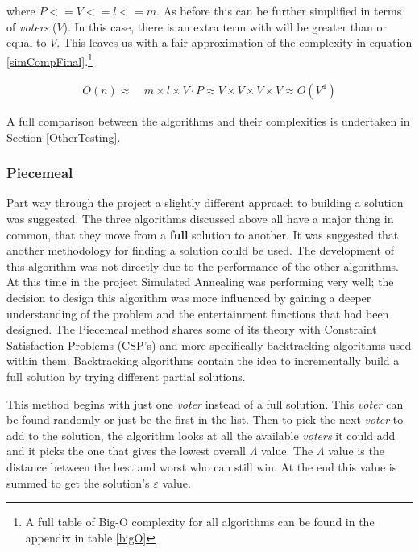 \documentclass[12pt]{report}
\begin{document}
where $P <= V <= l <= m$. As before this can be further simplified in terms of \textit{voters} ($V$). In this case, there is an extra term with will be greater than or equal to $V$. This leaves us with a fair approximation of the complexity in equation \ref{simCompFinal}.\footnote{A full table of Big-O complexity for all algorithms can be found in the appendix in table \ref{bigO}}

\begin{equation}\label{simCompFinal}
\begin{aligned}
	O(n) \approx{} & \ m \times l \times V \cdot P \approx V \times V \times V \times V \approx O(V^4)
\end{aligned}
\end{equation}

A full comparison between the algorithms and their complexities is undertaken in Section \ref{OtherTesting}.


\subsubsection{Piecemeal}
Part way through the project a slightly different approach to building a solution was suggested. The three algorithms discussed above all have a major thing in common, that they move from a \textbf{full} solution to another. It was suggested that another methodology for finding a solution could be used. The development of this algorithm was not directly due to the performance of the other algorithms. At this time in the project Simulated Annealing was performing very well; the decision to design this algorithm was more influenced by gaining a deeper understanding of the problem and the entertainment functions that had been designed. The Piecemeal method shares some of its theory with Constraint Satisfaction Problems (CSP's)\cite{CSP} and more specifically backtracking algorithms used within them\cite{backtracking}. Backtracking algorithms contain the idea to incrementally build a full solution by trying different partial solutions.

This method begins with just one \textit{voter} instead of a full solution. This \textit{voter} can be found randomly or just be the first in the list. Then to pick the next \textit{voter} to add to the solution, the algorithm looks at all the available \textit{voters} it could add and it picks the one that gives the lowest overall $\Lambda$ value. The $\Lambda$ value is the distance between the best and worst who can still win. At the end this value is summed to get the solution's $\varepsilon$ value.
\end{document}
